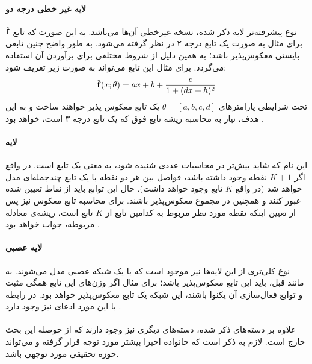 \paragraph*{لایه \coupling{}
    غیر خطی درجه دو}
نوع پیشرفته‌تر لایه ذکر شده، نسخه غیرخطی آن‌ها می‌باشد. به این صورت که تابع $\hat{{\bf f}}$ برای مثال به صورت یک تابع درجه ۲ در نظر گرفته می‌شود. به طور واضح چنین تابعی بایستی معکوس‌پذیر باشد؛‌ به همین دلیل از شروط مختلفی برای برآوردن آن استفاده می‌گردد. برای مثال این تابع می‌تواند به صورت زیر تعریف شود:
\begin{align}
\hat{{\bf f}}(x; \theta) = ax + b + \frac{c}{1 + (dx + h)^2}
\end{align}
تحت شرایطی پارامترهای $\theta=[a,b,c,d]$ یک تابع معکوس پذیر خواهند ساخت و به این هدف، نیاز به محاسبه ریشه تابع فوق که یک تابع درجه ۳ است، خواهد بود \cite{flow_survey}.
\paragraph*{لایه \coupling{} \spline{}}
این نام که شاید بیش‌تر در محاسبات عددی شنیده شود، به معنی یک تابع
است. در واقع اگر $K+1$ نقطه وجود داشته باشد، فواصل بین هر دو نقطه با یک تابع چندجمله‌ای مدل خواهد شد (در واقع $K$ تابع وجود خواهد داشت). حال این توابع باید از نقاط تعیین شده عبور کنند و همچنین در مجموع معکوس‌پذیر باشند. برای محاسبه تابع معکوس نیز پس از تعیین اینکه نقطه مورد نظر مربوط به کدامین تابع از $K$ تابع است، ریشه‌ی معادله مربوطه، جواب خواهد بود \cite{flow_survey}.
\paragraph*{لایه \coupling{} عصبی}
نوع کلی‌تری از این لایه‌ها نیز موجود است که با یک شبکه عصبی مدل می‌شوند. به مانند قبل،‌ باید این تابع معکوس‌پذیر باشد؛ برای مثال اگر وزن‌های این تابع همگی مثبت و توابع فعال‌سازی آن یکنوا باشند، این شبکه یک تابع معکوس‌پذیر خواهد بود. در رابطه با این مورد ادعای \univapprox{} نیز وجود دارد \cite{flow_survey}.
\\\\
علاوه بر دسته‌های ذکر شده، دسته‌های دیگری نیز وجود دارند که از حوصله این بحث خارج است. لازم به ذکر است که خانواده \normalizingflownets{} اخیرا بیشتر مورد توجه قرار گرفته و می‌تواند حوزه تحقیقی مورد توجهی باشد.
